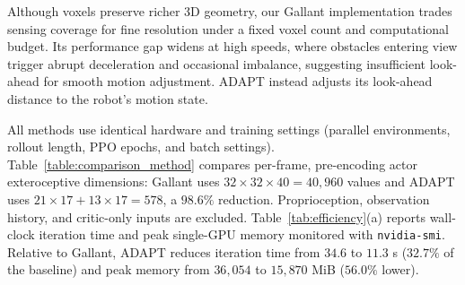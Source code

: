\documentclass[letterpaper, 10 pt, conference]{ieeeconf/ieeeconf}
\DeclareRobustCommand{\RevisionAdd}[1]{{\color{red}#1}}
\begin{document}
\RevisionAdd{Although voxels preserve richer 3D geometry, our Gallant implementation trades sensing coverage for fine resolution under a fixed voxel count and computational budget. Its performance gap widens at high speeds, where obstacles entering view trigger abrupt deceleration and occasional imbalance, suggesting insufficient look-ahead for smooth motion adjustment. ADAPT instead adjusts its look-ahead distance to the robot's motion state.
}

\RevisionAdd{All methods use identical hardware and training settings (parallel environments, rollout length, PPO epochs, and batch settings). Table~\ref{table:comparison_method} compares per-frame, pre-encoding actor exteroceptive dimensions: Gallant uses $32\times32\times40=40{,}960$ values and ADAPT uses $21\times17+13\times17=578$, a $98.6\%$ reduction. Proprioception, observation history, and critic-only inputs are excluded.
Table~\ref{tab:efficiency}(a) reports wall-clock iteration time and peak single-GPU memory monitored with \texttt{nvidia-smi}. Relative to Gallant, ADAPT reduces iteration time from $34.6$ to $11.3$ s ($32.7\%$ of the baseline) and peak memory from $36{,}054$ to $15{,}870$ MiB ($56.0\%$ lower).
}
\end{document}

